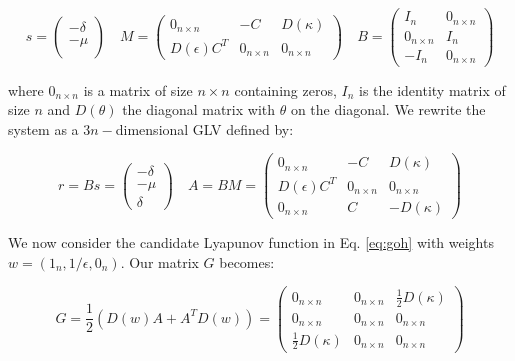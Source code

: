 \documentclass{article}
\begin{document}
\begin{equation}
\label{eq:crqp}
s = \begin{pmatrix}
-\delta \\
-\mu \\
\end{pmatrix} \quad 
M = \begin{pmatrix}
0_{n \times n} & -C & D(\kappa)\\
D(\epsilon)C^T & 0_{n \times n} & 0_{n \times n}
\end{pmatrix} \quad
B = \begin{pmatrix}
I_n & 0_{n \times n}\\
0_{n \times n} & I_n\\
-I_n & 0_{n \times n}
\end{pmatrix}
\end{equation}

where \(0_{n \times n}\) is a matrix of size \(n \times n\) containing
zeros, \(I_n\) is the identity matrix of size \(n\) and \(D(\theta)\)
the diagonal matrix with \(\theta\) on the diagonal. We rewrite the
system as a \(3n-\)dimensional GLV defined by:

\begin{equation}
r = B s = \begin{pmatrix}
-\delta \\
-\mu \\
\delta
\end{pmatrix} \quad
A = B M = \begin{pmatrix}
0_{n \times n} & -C & D(\kappa)\\
D(\epsilon) C^T & 0_{n \times n} & 0_{n \times n}\\
0_{n \times n} & C & -D(\kappa)
\end{pmatrix}
\end{equation}

We now consider the candidate Lyapunov function in Eq. \ref{eq:goh} with
weights \(w = (1_n, 1 / \epsilon, 0_n)\). Our matrix \(G\) becomes:

\begin{equation}
G = \frac{1}{2}(D(w) A + A^T D(w)) = \begin{pmatrix}
0_{n \times n} & 0_{n \times n} & \frac{1}{2} D(\kappa)\\
0_{n \times n} & 0_{n \times n} & 0_{n \times n}\\
\frac{1}{2} D(\kappa) & 0_{n \times n} & 0_{n \times n}
\end{pmatrix}
\end{equation}
\end{document}
